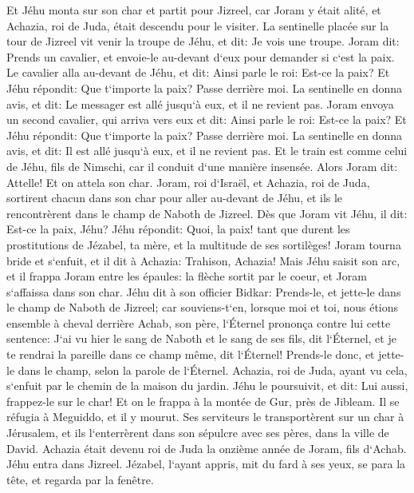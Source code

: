 \verse Et Jéhu monta sur son char et partit pour Jizreel, car Joram y était alité, et Achazia, roi de Juda, était descendu pour le visiter. 
\verse La sentinelle placée sur la tour de Jizreel vit venir la troupe de Jéhu, et dit: Je vois une troupe. Joram dit: Prends un cavalier, et envoie-le au-devant d`eux pour demander si c`est la paix. 
\verse Le cavalier alla au-devant de Jéhu, et dit: Ainsi parle le roi: Est-ce la paix? Et Jéhu répondit: Que t`importe la paix? Passe derrière moi. La sentinelle en donna avis, et dit: Le messager est allé jusqu`à eux, et il ne revient pas. 
\verse Joram envoya un second cavalier, qui arriva vers eux et dit: Ainsi parle le roi: Est-ce la paix? Et Jéhu répondit: Que t`importe la paix? Passe derrière moi. 
\verse La sentinelle en donna avis, et dit: Il est allé jusqu`à eux, et il ne revient pas. Et le train est comme celui de Jéhu, fils de Nimschi, car il conduit d`une manière insensée. 
\verse Alors Joram dit: Attelle! Et on attela son char. Joram, roi d`Israël, et Achazia, roi de Juda, sortirent chacun dans son char pour aller au-devant de Jéhu, et ils le rencontrèrent dans le champ de Naboth de Jizreel. 
\verse Dès que Joram vit Jéhu, il dit: Est-ce la paix, Jéhu? Jéhu répondit: Quoi, la paix! tant que durent les prostitutions de Jézabel, ta mère, et la multitude de ses sortilèges! 
\verse Joram tourna bride et s`enfuit, et il dit à Achazia: Trahison, Achazia! 
\verse Mais Jéhu saisit son arc, et il frappa Joram entre les épaules: la flèche sortit par le coeur, et Joram s`affaissa dans son char. 
\verse Jéhu dit à son officier Bidkar: Prends-le, et jette-le dans le champ de Naboth de Jizreel; car souviens-t`en, lorsque moi et toi, nous étions ensemble à cheval derrière Achab, son père, l`Éternel prononça contre lui cette sentence: 
\verse J`ai vu hier le sang de Naboth et le sang de ses fils, dit l`Éternel, et je te rendrai la pareille dans ce champ même, dit l`Éternel! Prends-le donc, et jette-le dans le champ, selon la parole de l`Éternel. 
\verse Achazia, roi de Juda, ayant vu cela, s`enfuit par le chemin de la maison du jardin. Jéhu le poursuivit, et dit: Lui aussi, frappez-le sur le char! Et on le frappa à la montée de Gur, près de Jibleam. Il se réfugia à Meguiddo, et il y mourut. 
\verse Ses serviteurs le transportèrent sur un char à Jérusalem, et ils l`enterrèrent dans son sépulcre avec ses pères, dans la ville de David. 
\verse Achazia était devenu roi de Juda la onzième année de Joram, fils d`Achab. 
\verse Jéhu entra dans Jizreel. Jézabel, l`ayant appris, mit du fard à ses yeux, se para la tête, et regarda par la fenêtre. 
